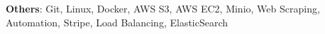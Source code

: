 \textbf{Others}{: Git, Linux, Docker, AWS S3, AWS EC2, Minio, Web Scraping, Automation, Stripe, Load Balancing, ElasticSearch} \\
